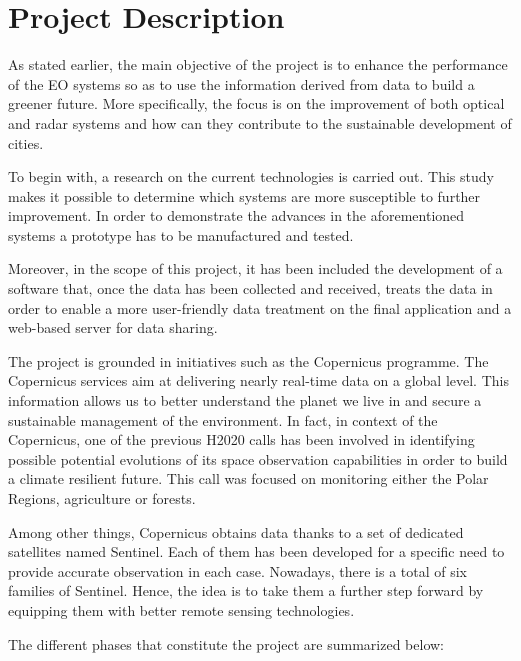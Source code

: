 \section{Project Description}
As stated earlier, the main objective of the project is to enhance the performance of the EO systems so as to use the information derived from data to build a greener future. More specifically, the focus is on the improvement of both optical and radar systems and how can they contribute to the sustainable development of cities. 

To begin with, a research on the current technologies is carried out. This study makes it possible to determine which systems are more susceptible to further improvement. In order to demonstrate the advances in the aforementioned systems a prototype has to be manufactured and tested. 

Moreover, in the scope of this project, it has been included the development of a software that, once the data has been collected and received, treats the data in order to enable a more user-friendly data treatment on the final application and a web-based server for data sharing.

The project is grounded in initiatives such as the Copernicus programme. The Copernicus services aim at delivering nearly real-time data on a global level. This information allows us to better understand the planet we live in and secure a sustainable management of the environment. In fact, in context of the Copernicus, one of the previous H2020 calls has been involved in identifying possible potential evolutions of its space observation capabilities in order to build a climate resilient future. This call was focused on monitoring either the Polar Regions, agriculture or forests.

Among other things, Copernicus obtains data thanks to a set of dedicated satellites named Sentinel. Each of them has been developed for a specific need to provide accurate observation in each case. Nowadays, there is a total of six families of Sentinel. Hence, the idea is to take them a further step forward by equipping them with better remote sensing technologies. 

The different phases that constitute the project are summarized below:

